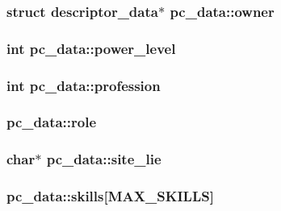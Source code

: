\hypertarget{structpc__data_aa784fe7f400f8836b6ccfdddca244414}{
\subsubsection[{owner}]{\setlength{\rightskip}{0pt plus 5cm}struct {\bf descriptor\-\_\-data}$\ast$ pc\-\_\-data\-::owner}}\label{structpc__data_aa784fe7f400f8836b6ccfdddca244414}
\hypertarget{structpc__data_a76732417756ca8254fee6dd7bd636bad}{
\subsubsection[{power\-\_\-level}]{\setlength{\rightskip}{0pt plus 5cm}int pc\-\_\-data\-::power\-\_\-level}}\label{structpc__data_a76732417756ca8254fee6dd7bd636bad}
\hypertarget{structpc__data_ac8e0800801facdaba67427dd7d3509a6}{
\subsubsection[{profession}]{\setlength{\rightskip}{0pt plus 5cm}int pc\-\_\-data\-::profession}}\label{structpc__data_ac8e0800801facdaba67427dd7d3509a6}
\hypertarget{structpc__data_a2a24542d1c9e54e9a63c3630bd47c746}{
\subsubsection[{role}]{ pc\-\_\-data\-::role}}\label{structpc__data_a2a24542d1c9e54e9a63c3630bd47c746}
\hypertarget{structpc__data_abcee2929e5db6713232458bbaff3d02e}{
\subsubsection[{site\-\_\-lie}]{\setlength{\rightskip}{0pt plus 5cm}char$\ast$ pc\-\_\-data\-::site\-\_\-lie}}\label{structpc__data_abcee2929e5db6713232458bbaff3d02e}
\hypertarget{structpc__data_acea1f164f11de5f686983c8923934d88}{
\subsubsection[{skills}]{ pc\-\_\-data\-::skills\mbox{[}{\bf M\-A\-X\-\_\-\-S\-K\-I\-L\-L\-S}\mbox{]}}}\label{structpc__data_acea1f164f11de5f686983c8923934d88}
